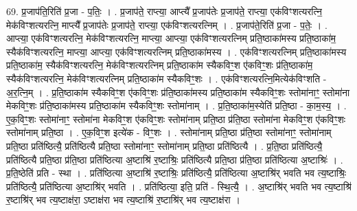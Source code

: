 \documentclass[17pt]{extarticle}
\begin{document}
69. प्र॒जाप॑ति॒रिति॑ प्र॒जा - प॒तिः॒ । . प्र॒जाप॑ते॒ राप्त्या॒ आप्त्यै᳚ प्र॒जाप॑तेः प्र॒जाप॑ते॒ राप्त्या॒ एक॑विꣳशत्यरत्नि॒ मेक॑विꣳशत्यरत्नि॒ माप्त्यै᳚ प्र॒जाप॑तेः प्र॒जाप॑ते॒ राप्त्या॒ एक॑विꣳशत्यरत्निम् । . प्र॒जाप॑ते॒रिति॑ प्र॒जा - प॒तेः॒ । . आप्त्या॒ एक॑विꣳशत्यरत्नि॒ मेक॑विꣳशत्यरत्नि॒ माप्त्या॒ आप्त्या॒ एक॑विꣳशत्यरत्निम् प्रति॒ष्ठाका॑मस्य प्रति॒ष्ठाका॑म॒ स्यैक॑विꣳशत्यरत्नि॒ माप्त्या॒ आप्त्या॒ एक॑विꣳशत्यरत्निम् प्रति॒ष्ठाका॑मस्य । . एक॑विꣳशत्यरत्निम् प्रति॒ष्ठाका॑मस्य प्रति॒ष्ठाका॑म॒ स्यैक॑विꣳशत्यरत्नि॒ मेक॑विꣳशत्यरत्निम् प्रति॒ष्ठाका॑म स्यैकविꣳ॒॒श ए॑कविꣳ॒॒शः प्र॑ति॒ष्ठाका॑म॒ स्यैक॑विꣳशत्यरत्नि॒ मेक॑विꣳशत्यरत्निम् प्रति॒ष्ठाका॑म स्यैकविꣳ॒॒शः । . एक॑विꣳशत्यरत्नि॒मित्येक॑विꣳशति - अ॒र॒त्नि॒म् । . प्र॒ति॒ष्ठाका॑म स्यैकविꣳ॒॒श ए॑कविꣳ॒॒शः प्र॑ति॒ष्ठाका॑मस्य प्रति॒ष्ठाका॑म स्यैकविꣳ॒॒शः स्तोमा॑नाꣳ॒॒ स्तोमा॑ना मेकविꣳ॒॒शः प्र॑ति॒ष्ठाका॑मस्य प्रति॒ष्ठाका॑म स्यैकविꣳ॒॒शः स्तोमा॑नाम् । . प्र॒ति॒ष्ठाका॑म॒स्येति॑ प्रति॒ष्ठा - का॒म॒स्य॒ । . ए॒क॒विꣳ॒॒शः स्तोमा॑नाꣳ॒॒ स्तोमा॑ना मेकविꣳ॒॒श ए॑कविꣳ॒॒शः स्तोमा॑नाम् प्रति॒ष्ठा प्र॑ति॒ष्ठा स्तोमा॑ना मेकविꣳ॒॒श ए॑कविꣳ॒॒शः स्तोमा॑नाम् प्रति॒ष्ठा । . ए॒क॒विꣳ॒॒श इत्ये॑क - विꣳ॒॒शः । . स्तोमा॑नाम् प्रति॒ष्ठा प्र॑ति॒ष्ठा स्तोमा॑नाꣳ॒॒ स्तोमा॑नाम् प्रति॒ष्ठा प्रति॑ष्ठित्यै॒ प्रति॑ष्ठित्यै प्रति॒ष्ठा स्तोमा॑नाꣳ॒॒ स्तोमा॑नाम् प्रति॒ष्ठा प्रति॑ष्ठित्यै । . प्र॒ति॒ष्ठा प्रति॑ष्ठित्यै॒ प्रति॑ष्ठित्यै प्रति॒ष्ठा प्र॑ति॒ष्ठा प्रति॑ष्ठित्या अ॒ष्टाश्रि॑ र॒ष्टाश्रिः॒ प्रति॑ष्ठित्यै प्रति॒ष्ठा प्र॑ति॒ष्ठा प्रति॑ष्ठित्या अ॒ष्टाश्रिः॑ । . प्र॒ति॒ष्ठेति॑ प्रति - स्था । . प्रति॑ष्ठित्या अ॒ष्टाश्रि॑ र॒ष्टाश्रिः॒ प्रति॑ष्ठित्यै॒ प्रति॑ष्ठित्या अ॒ष्टाश्रि॑र् भवति भव त्य॒ष्टाश्रिः॒ प्रति॑ष्ठित्यै॒ प्रति॑ष्ठित्या अ॒ष्टाश्रि॑र् भवति । . प्रति॑ष्ठित्या॒ इति॒ प्रति॑ - स्थि॒त्यै॒ । . अ॒ष्टाश्रि॑र् भवति भव त्य॒ष्टाश्रि॑ र॒ष्टाश्रि॑र् भव त्य॒ष्टाक्ष॑रा॒ ऽष्टाक्ष॑रा भव त्य॒ष्टाश्रि॑ र॒ष्टाश्रि॑र् भव त्य॒ष्टाक्ष॑रा । \newline
\end{document}
